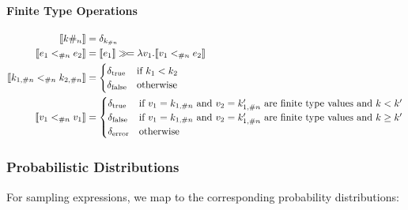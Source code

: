 \paragraph{Finite Type Operations}
\begin{align*}
\sem{ \finconst{k}{n} } &= \delta_{k_{\#n}} \\
%
\sem{ e_1 \finlt{n} e_2 } &= \sem{ e_1 } \gg\!= \lambda v_1. \sem{ v_1 \finlt{n} e_2 } \\
%
\sem{ k_{1,\#n} \finlt{n} k_{2,\#n} } &= \begin{cases}
    \delta_{\text{true}} & \text{if } k_1 < k_2 \\
    \delta_{\text{false}} & \text{otherwise}
\end{cases} \\
%
\sem{ v_1 \finlt{n} v_1 } &= \begin{cases}
	\delta_{\text{true}} & \text{if $v_1 = k_{1,\#n}$ and $v_2=k_{1,\#n}'$ are finite type values and}~k < k' \\
	\delta_{\text{false}} & \text{if $v_1 = k_{1,\#n}$ and $v_2=k_{1,\#n}'$ are finite type values and}~k \geq k' \\
	\delta_{\error} & \text{otherwise}
\end{cases}
\end{align*}

\subsubsection{Probabilistic Distributions}

For sampling expressions, we map to the corresponding probability distributions:

